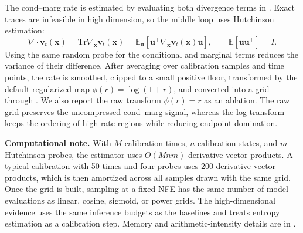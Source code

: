 \documentclass{article}
\newcommand{\E}{\mathbb{E}}
\newcommand{\Tr}{\mathrm{Tr}}
\newcommand{\vx}{\bm{x}}
\newcommand{\vv}{\bm{v}}
\newcommand{\vu}{\bm{u}}
\newcommand{\diver}{\nabla\!\cdot}
\theoremstyle{plain}
\theoremstyle{definition}
\theoremstyle{remark}
\begin{document}
The cond--marg rate is estimated by evaluating both divergence terms in . Exact traces are infeasible in high dimension, so the middle loop uses Hutchinson estimation:
\begin{equation}
  \diver \vv_t(\vx)
  =
  \Tr \nabla_{\vx}\vv_t(\vx)
  =
  \E_{\vu}\!\left[\vu^\top\nabla_{\vx}\vv_t(\vx)\vu\right],
  \qquad
  \E[\vu\vu^\top]=I.
  \label{eq:hutch}
\end{equation}
Using the same random probe for the conditional and marginal terms reduces the variance of their difference. After averaging over calibration samples and time points, the rate is smoothed, clipped to a small positive floor, transformed by the default regularized map $\phi(r)=\log(1+r)$, and converted into a grid through . We also report the raw transform $\phi(r)=r$  as an ablation. The raw grid preserves the uncompressed cond--marg signal, whereas the log transform keeps the ordering of high-rate regions while reducing endpoint domination.


\begin{computebox}
\textbf{Computational note.} With $M$ calibration times, $n$ calibration states, and $m$ Hutchinson probes, the estimator uses $O(Mnm)$ derivative-vector products. A typical calibration with 50 times and four probes uses 200 derivative-vector products, which is then amortized across all samples drawn with the same grid. Once the grid is built, sampling at a fixed NFE has the same number of model evaluations as linear, cosine, sigmoid, or power grids. The high-dimensional evidence uses the same inference budgets as the baselines and treats entropy estimation as a calibration step. Memory and arithmetic-intensity details are in .
\end{computebox}
\end{document}
